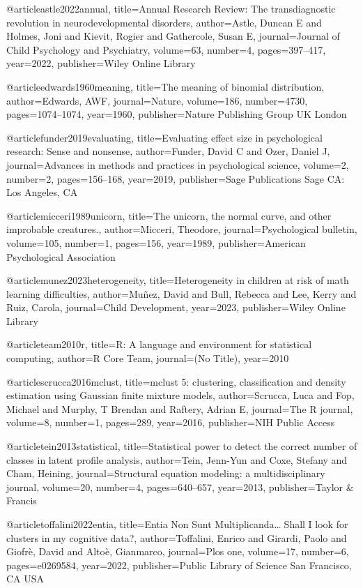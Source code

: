 @article{astle2022annual,
  title={Annual Research Review: The transdiagnostic revolution in neurodevelopmental disorders},
  author={Astle, Duncan E and Holmes, Joni and Kievit, Rogier and Gathercole, Susan E},
  journal={Journal of Child Psychology and Psychiatry},
  volume={63},
  number={4},
  pages={397--417},
  year={2022},
  publisher={Wiley Online Library}
}

@article{edwards1960meaning,
  title={The meaning of binomial distribution},
  author={Edwards, AWF},
  journal={Nature},
  volume={186},
  number={4730},
  pages={1074--1074},
  year={1960},
  publisher={Nature Publishing Group UK London}
}

@article{funder2019evaluating,
  title={Evaluating effect size in psychological research: Sense and nonsense},
  author={Funder, David C and Ozer, Daniel J},
  journal={Advances in methods and practices in psychological science},
  volume={2},
  number={2},
  pages={156--168},
  year={2019},
  publisher={Sage Publications Sage CA: Los Angeles, CA}
}

@article{micceri1989unicorn,
  title={The unicorn, the normal curve, and other improbable creatures.},
  author={Micceri, Theodore},
  journal={Psychological bulletin},
  volume={105},
  number={1},
  pages={156},
  year={1989},
  publisher={American Psychological Association}
}

@article{munez2023heterogeneity,
  title={Heterogeneity in children at risk of math learning difficulties},
  author={Mu{\~n}ez, David and Bull, Rebecca and Lee, Kerry and Ruiz, Carola},
  journal={Child Development},
  year={2023},
  publisher={Wiley Online Library}
}

@article{team2010r,
  title={R: A language and environment for statistical computing},
  author={{R Core Team}},
  journal={(No Title)},
  year={2010}
}

@article{scrucca2016mclust,
  title={mclust 5: clustering, classification and density estimation using Gaussian finite mixture models},
  author={Scrucca, Luca and Fop, Michael and Murphy, T Brendan and Raftery, Adrian E},
  journal={The R journal},
  volume={8},
  number={1},
  pages={289},
  year={2016},
  publisher={NIH Public Access}
}


@article{tein2013statistical,
  title={Statistical power to detect the correct number of classes in latent profile analysis},
  author={Tein, Jenn-Yun and Coxe, Stefany and Cham, Heining},
  journal={Structural equation modeling: a multidisciplinary journal},
  volume={20},
  number={4},
  pages={640--657},
  year={2013},
  publisher={Taylor \& Francis}
}

@article{toffalini2022entia,
  title={Entia Non Sunt Multiplicanda… Shall I look for clusters in my cognitive data?},
  author={Toffalini, Enrico and Girardi, Paolo and Giofr{\`e}, David and Alto{\`e}, Gianmarco},
  journal={Plos one},
  volume={17},
  number={6},
  pages={e0269584},
  year={2022},
  publisher={Public Library of Science San Francisco, CA USA}
}




